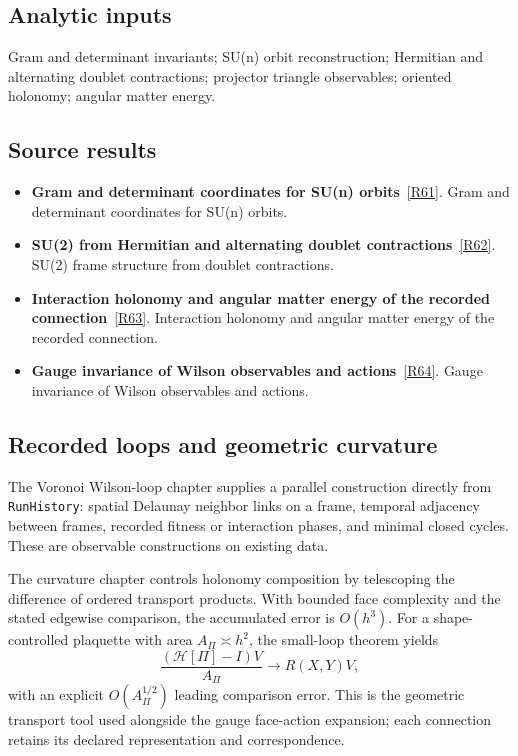 \documentclass[11pt,a4paper]{article}
\begin{document}
\subsection*{Analytic inputs}
Gram and determinant invariants; SU(n) orbit reconstruction; Hermitian and alternating doublet contractions; projector triangle observables; oriented holonomy; angular matter energy.
\subsection*{Source results}
\begin{itemize}
\item \textbf{Gram and determinant coordinates for SU(n) orbits}~\hyperref[src:thm-sm-direct-orbit-isomorphism]{[R61]}. Gram and determinant coordinates for SU(n) orbits.
\item \textbf{SU(2) from Hermitian and alternating doublet contractions}~\hyperref[src:thm-sm-direct-su2-invariants]{[R62]}. SU(2) frame structure from doublet contractions.
\item \textbf{Interaction holonomy and angular matter energy of the recorded connection}~\hyperref[src:prop-ym-recorded-interaction-sector]{[R63]}. Interaction holonomy and angular matter energy of the recorded connection.
\item \textbf{Gauge invariance of Wilson observables and actions}~\hyperref[src:thm-wilson-action-gauge-invariance]{[R64]}. Gauge invariance of Wilson observables and actions.
\end{itemize}
\subsection*{Recorded loops and geometric curvature}
The Voronoi Wilson-loop chapter supplies a parallel construction directly from \texttt{RunHistory}: spatial Delaunay neighbor links on a frame, temporal adjacency between frames, recorded fitness or interaction phases, and minimal closed cycles. These are observable constructions on existing data.

The curvature chapter controls holonomy composition by telescoping the difference of ordered transport products. With bounded face complexity and the stated edgewise comparison, the accumulated error is \(O(h^3)\). For a shape-controlled plaquette with area \(A_\Pi\asymp h^2\), the small-loop theorem yields
\[
\frac{(\mathcal H[\Pi]-I)V}{A_\Pi}
\longrightarrow R(X,Y)V,
\]
with an explicit \(O(A_\Pi^{1/2})\) leading comparison error. This is the geometric transport tool used alongside the gauge face-action expansion; each connection retains its declared representation and correspondence.
\end{document}
